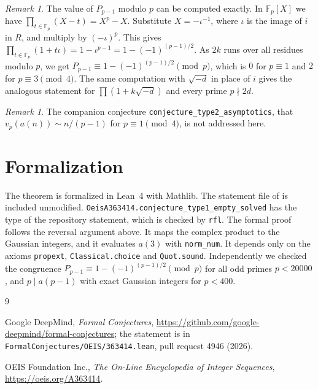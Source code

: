 \documentclass[11pt]{amsart}
\theoremstyle{remark}
\newtheorem{remark}[theorem]{Remark}
\newcommand{\F}{\mathbb{F}}
\newcommand{\lean}[1]{\texttt{#1}}
\begin{document}
\begin{remark}
The value of $P_{p-1}$ modulo $p$ can be computed exactly.
In $\F_p[X]$ we have $\prod_{t\in\F_p}(X-t)=X^p-X$.
Substitute $X=-\iota^{-1}$, where $\iota$ is the image of $i$ in $R$, and multiply by $(-\iota)^p$.
This gives $\prod_{t\in\F_p}(1+t\iota)=1-\iota^{p-1}=1-(-1)^{(p-1)/2}$.
As $2k$ runs over all residues modulo $p$, we get $P_{p-1}\equiv1-(-1)^{(p-1)/2}\pmod p$, which is $0$ for $p\equiv1$ and $2$ for $p\equiv3\pmod4$.
The same computation with $\sqrt{-d}$ in place of $i$ gives the analogous statement for $\prod(1+k\sqrt{-d})$ and every prime $p\nmid2d$.
\end{remark}

\begin{remark}
The companion conjecture \lean{conjecture\_type2\_asymptotics}, that $v_p(a(n))\sim n/(p-1)$ for $p\equiv1\pmod4$, is not addressed here.
\end{remark}

\section{Formalization}

The theorem is formalized in Lean~4 with Mathlib.
The statement file of \cite{FC} is included unmodified.
\lean{OeisA363414.conjecture\_type1\_empty\_solved} has the type of the repository statement, which is checked by \lean{rfl}.
The formal proof follows the reversal argument above.
It maps the complex product to the Gaussian integers, and it evaluates $a(3)$ with \lean{norm\_num}.
It depends only on the axioms \lean{propext}, \lean{Classical.choice} and \lean{Quot.sound}.
Independently we checked the congruence $P_{p-1}\equiv1-(-1)^{(p-1)/2}\pmod p$ for all odd primes $p<20000$, and $p\mid a(p-1)$ with exact Gaussian integers for $p<400$.

\begin{thebibliography}{9}

Google DeepMind, \emph{Formal Conjectures}, \url{https://github.com/google-deepmind/formal-conjectures}; the statement is in \texttt{FormalConjectures/OEIS/363414.lean}, pull request 4946 (2026).

OEIS Foundation Inc., \emph{The On-Line Encyclopedia of Integer Sequences}, \url{https://oeis.org/A363414}.

\end{thebibliography}
\end{document}
